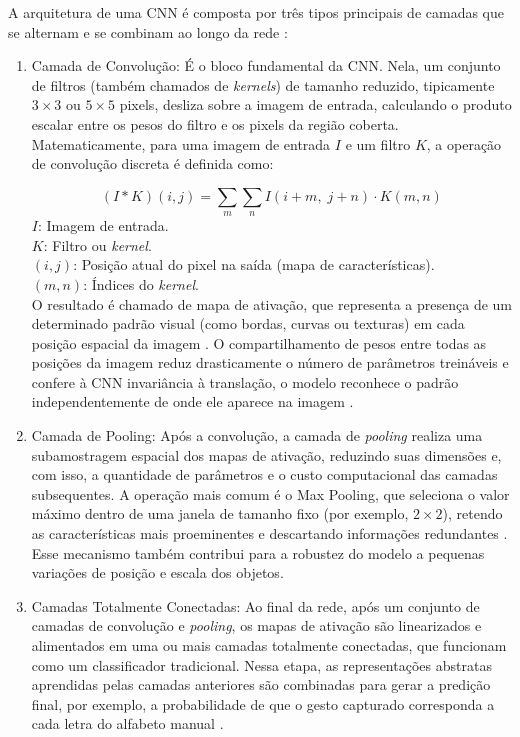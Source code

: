 \documentclass[
    12pt,                %
    openright,           %
    oneside,             %
    a4paper,             %
    english,             %
    brazil               %
]{abntex2}
\begin{document}
A arquitetura de uma CNN é composta por três tipos principais de camadas que se alternam e se combinam ao longo da rede \cite{Goodfellow2016}:
 
\begin{enumerate}
 
  \item Camada de Convolução: É o bloco fundamental da CNN. Nela, um conjunto de filtros (também chamados de \textit{kernels}) de tamanho reduzido, tipicamente $3 \times 3$ ou $5 \times 5$ pixels, desliza sobre a imagem de entrada, calculando o produto escalar entre os pesos do filtro e os pixels da região coberta. Matematicamente, para uma imagem de entrada $I$ e um filtro $K$, a operação de convolução discreta é definida como:
 
  \begin{equation}
      (I * K)(i, j) = \sum_{m}\sum_{n} I(i+m,\; j+n) \cdot K(m, n)
  \end{equation}
  $I$: Imagem de entrada. \\
  $K$: Filtro ou \textit{kernel}. \\
  $(i, j)$: Posição atual do pixel na saída (mapa de características). \\
  $(m, n)$: Índices do \textit{kernel}. \\
 
  O resultado é chamado de mapa de ativação, que representa a presença de um determinado padrão visual (como bordas, curvas ou texturas) em cada posição espacial da imagem \cite{Goodfellow2016}. O compartilhamento de pesos entre todas as posições da imagem reduz drasticamente o número de parâmetros treináveis e confere à CNN invariância à translação, o modelo reconhece o padrão independentemente de onde ele aparece na imagem \cite{Fleck2016}.
 
  \item Camada de Pooling: Após a convolução, a camada de \textit{pooling} realiza uma subamostragem espacial dos mapas de ativação, reduzindo suas dimensões e, com isso, a quantidade de parâmetros e o custo computacional das camadas subsequentes. A operação mais comum é o Max Pooling, que seleciona o valor máximo dentro de uma janela de tamanho fixo (por exemplo, $2 \times 2$), retendo as características mais proeminentes e descartando informações redundantes \cite{Lecun1998}. Esse mecanismo também contribui para a robustez do modelo a pequenas variações de posição e escala dos objetos.
 
  \item Camadas Totalmente Conectadas: Ao final da rede, após um conjunto de camadas de convolução e \textit{pooling}, os mapas de ativação são linearizados e alimentados em uma ou mais camadas totalmente conectadas, que funcionam como um classificador tradicional. Nessa etapa, as representações abstratas aprendidas pelas camadas anteriores são combinadas para gerar a predição final, por exemplo, a probabilidade de que o gesto capturado corresponda a cada letra do alfabeto manual \cite{Furtado2019}.
 
\end{enumerate}
  
\end{document}
